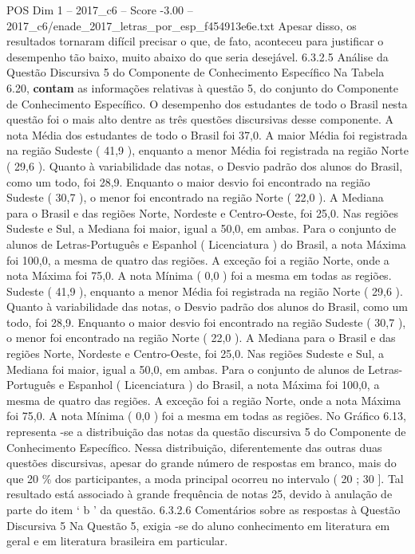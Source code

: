 \begin{textsample}{POS Dim 1 – 2017\_c6 – Score -3.00 – 2017\_c6/enade\_2017\_letras\_por\_esp\_f454913e6e.txt}
Apesar disso, os resultados tornaram difícil precisar o que, de fato, aconteceu para justificar o desempenho tão baixo, muito abaixo do que seria desejável. 6.3.2.5 Análise da Questão Discursiva 5 do Componente de Conhecimento Específico Na Tabela 6.20, \textbf{contam} as informações relativas à questão 5, do conjunto do Componente de Conhecimento Específico.
O desempenho dos estudantes de todo o Brasil nesta questão foi o mais alto dentre as três questões discursivas desse componente.
A nota Média dos estudantes de todo o Brasil foi 37,0.
A maior Média foi registrada na região Sudeste ( 41,9 ), enquanto a menor Média foi registrada na região Norte ( 29,6 ).
Quanto à variabilidade das notas, o Desvio padrão dos alunos do Brasil, como um todo, foi 28,9.
Enquanto o maior desvio foi encontrado na região Sudeste ( 30,7 ), o menor foi encontrado na região Norte ( 22,0 ).
A Mediana para o Brasil e das regiões Norte, Nordeste e Centro-Oeste, foi 25,0.
Nas regiões Sudeste e Sul, a Mediana foi maior, igual a 50,0, em ambas.
Para o conjunto de alunos de Letras-Português e Espanhol ( Licenciatura ) do Brasil, a nota Máxima foi 100,0, a mesma de quatro das regiões.
A exceção foi a região Norte, onde a nota Máxima foi 75,0.
A nota Mínima ( 0,0 ) foi a mesma em todas as regiões.
Sudeste ( 41,9 ), enquanto a menor Média foi registrada na região Norte ( 29,6 ).
Quanto à variabilidade das notas, o Desvio padrão dos alunos do Brasil, como um todo, foi 28,9.
Enquanto o maior desvio foi encontrado na região Sudeste ( 30,7 ), o menor foi encontrado na região Norte ( 22,0 ).
A Mediana para o Brasil e das regiões Norte, Nordeste e Centro-Oeste, foi 25,0.
Nas regiões Sudeste e Sul, a Mediana foi maior, igual a 50,0, em ambas.
Para o conjunto de alunos de Letras-Português e Espanhol ( Licenciatura ) do Brasil, a nota Máxima foi 100,0, a mesma de quatro das regiões.
A exceção foi a região Norte, onde a nota Máxima foi 75,0.
A nota Mínima ( 0,0 ) foi a mesma em todas as regiões.
No Gráfico 6.13, representa -se a distribuição das notas da questão discursiva 5 do Componente de Conhecimento Específico.
Nessa distribuição, diferentemente das outras duas questões discursivas, apesar do grande número de respostas em branco, mais do que 20 \% dos participantes, a moda principal ocorreu no intervalo ( 20 ; 30 ].
Tal resultado está associado à grande frequência de notas 25, devido à anulação de parte do item ‘ b ’ da questão. 6.3.2.6 Comentários sobre as respostas à Questão Discursiva 5 Na Questão 5, exigia -se do aluno conhecimento em literatura em geral e em literatura brasileira em particular.

\end{textsample}

